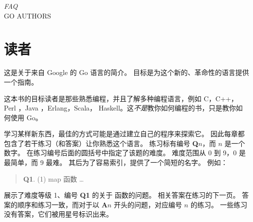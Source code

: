 {\textit{FAQ}\\ \textsc{GO AUTHORS}}

\section{读者}
\noindent{}这是关于来自 Google 的 Go 语言的简介。
目标是为这个新的、革命性的语言提供一个指南。

这本书的目标读者是那些熟悉编程，并且了解多种编程语言，例如 C\cite{c}，C++\cite{c++}，
Perl \cite{perl}，Java \cite{java}，Erlang\cite{erlang}，Scala\cite{scala}，
Haskell\cite{haskell}。这\emph{不是}教你如何编程的书，只是教你如何使用 Go。

学习某样新东西，最佳的方式可能是通过建立自己的程序来探索它。
因此每章都包含了若干练习（和答案）让你熟悉这个语言。
练习标有编号 \textbf{Q$n$}，而 $n$ 是一个数字。 
在练习编号后面的圆括号中指定了该题的难度。
难度范围从 0 到 9，0 是最简单，而 9 最难。
其后为了容易索引，提供了一个简短的名字。
例如：
\begin{verse}
\textbf{Q1}. (1) map 函数 \ldots
\end{verse}
展示了难度等级 1、编号 \textbf{Q1} 的关于  函数的问题。
相关答案在练习的下一页。
答案的顺序和练习一致，而对于以 \textbf{A$n$} 开头的问题，对应编号 $n$ 的练习。
一些练习没有答案，它们被用星号标识出来。

